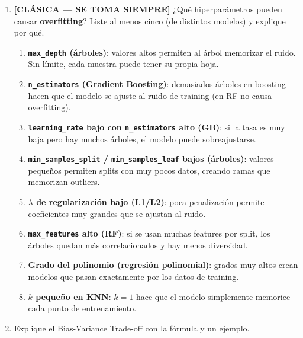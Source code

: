 \documentclass[11pt,a4paper]{article}
\begin{document}
\begin{enumerate}[label=\textbf{P\arabic*.}, resume]

\item \leavevmode

\begin{classicbox}
\textcolor{tdred}{\textbf{[CL\'ASICA --- SE TOMA SIEMPRE]}}
¿Qu\'e hiperpar\'ametros pueden causar \textbf{overfitting}? Liste al menos cinco
(de distintos modelos) y explique por qu\'e.
\end{classicbox}

\begin{answerbox}
\begin{enumerate}[label=\arabic*., topsep=2pt, itemsep=5pt]
  \item \textbf{\texttt{max\_depth} (\'arboles)}: valores altos permiten al \'arbol
    memorizar el ruido. Sin l\'imite, cada muestra puede tener su propia hoja.
  \item \textbf{\texttt{n\_estimators} (Gradient Boosting)}: demasiados \'arboles en
    boosting hacen que el modelo se ajuste al ruido de training (en RF no causa overfitting).
  \item \textbf{\texttt{learning\_rate} bajo con \texttt{n\_estimators} alto (GB)}: si la
    tasa es muy baja pero hay muchos \'arboles, el modelo puede sobreajustarse.
  \item \textbf{\texttt{min\_samples\_split} / \texttt{min\_samples\_leaf} bajos (\'arboles)}:
    valores peque\~nos permiten splits con muy pocos datos, creando ramas que memorizan
    outliers.
  \item \textbf{$\lambda$ de regularizaci\'on bajo (L1/L2)}: poca penalizaci\'on permite
    coeficientes muy grandes que se ajustan al ruido.
  \item \textbf{\texttt{max\_features} alto (RF)}: si se usan muchas features por split,
    los \'arboles quedan m\'as correlacionados y hay menos diversidad.
  \item \textbf{Grado del polinomio (regresi\'on polinomial)}: grados muy altos crean
    modelos que pasan exactamente por los datos de training.
  \item \textbf{$k$ peque\~no en KNN}: $k=1$ hace que el modelo simplemente memorice
    cada punto de entrenamiento.
\end{enumerate}
\end{answerbox}

\item Explique el Bias-Variance Trade-off con la f\'ormula y un ejemplo.


\end{enumerate}
\end{document}

